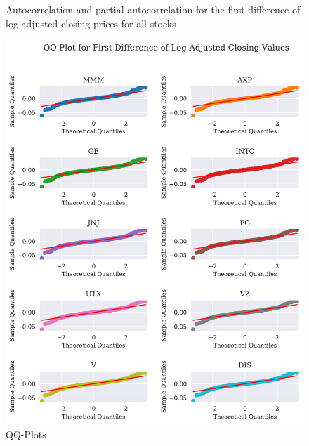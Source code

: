 \begin{figure}[H]
    \centering
    \begin{adjustbox}{width=.9\textwidth,center}
    
    \end{adjustbox}  
    \caption{Autocorrelation and partial autocorrelation for the first difference of log adjusted closing prices for all stocks}
    \label{fig:all_autocorr_fd_log_adjclose}
\end{figure}{}


\begin{figure}[h]
    \centering
    \begin{adjustbox}{width=.9\textwidth,center}
    \includegraphics[]{figures/all_qq_plot_fd_log_adjclose.pdf}
    \end{adjustbox}  
    \caption{QQ-Plots}
    \label{fig:all_qq_fd_log_adjclose}
\end{figure}{}










